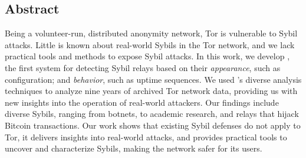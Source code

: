 \subsection*{Abstract}
Being a volunteer-run, distributed anonymity network, Tor is vulnerable to Sybil
attacks.  Little is known about real-world Sybils in the Tor network, and we
lack practical tools and methods to expose Sybil attacks.
%
In this work, we develop \emph{\sys}, the first system for detecting Sybil
relays based on their \emph{appearance}, such as configuration; and
\emph{behavior}, such as uptime sequences.  We used \sys's diverse analysis
techniques to analyze nine years of archived Tor network data, providing us with
new insights into the operation of real-world attackers.  Our findings include
diverse Sybils, ranging from botnets, to academic research, and relays that
hijack Bitcoin transactions.
%
Our work shows that existing Sybil defenses do not apply to Tor, it delivers
insights into real-world attacks, and provides practical tools to uncover and
characterize Sybils, making the network safer for its users.
